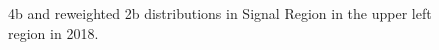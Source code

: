 \begin{figure}[ht]
 
 
    \caption{4b and reweighted 2b distributions in Signal Region in the upper left region in 2018.}
    \label{fig:upper-left-4b-SR-2018}
\end{figure}


